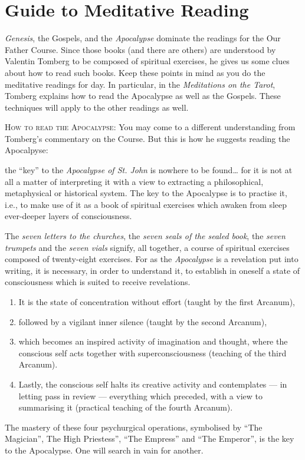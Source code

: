 \chapter{Guide to Meditative Reading}

\emph{Genesis}, the Gospels, and the \emph{Apocalypse} dominate the readings for the Our Father Course. Since those
books (and there are others) are understood by Valentin Tomberg to be composed of spiritual exercises, he gives us some
clues about how to read such books. Keep these points in mind as you do the meditative readings for day. In particular,
in the \emph{Meditations on the Tarot}, Tomberg explains how to read the Apocalypse as well as the Gospels. These
techniques will apply to the other readings as well.

\textsc{How to read the Apocalypse:}
You may come to a different understanding from Tomberg's commentary on the Course. But this is how
he suggests reading the Apocalpyse:

\begin{quotationx}
the “key” to the \emph{Apocalypse of St. John} is nowhere to be found… for it is not at all a matter of interpreting it
with a view to extracting a philosophical, metaphysical or historical system. The key to the Apocalypse is to practise
it, i.e., to make use of it as a book of spiritual exercises which awaken from sleep ever-deeper layers of
consciousness.

The \emph{seven letters to the churches}, the \emph{seven seals of the sealed book}, the \emph{seven trumpets} and the
\emph{seven vials} signify, all together, a course of spiritual exercises composed of twenty-eight exercises. For as
the \emph{Apocalypse} is a revelation put into writing, it is necessary, in order to understand it, to establish in
oneself a state of consciousness which is suited to receive revelations.

\begin{enumerate}
\item
It is the state of concentration without effort (taught by the first Arcanum), 
\item
followed by a vigilant inner silence (taught by the second Arcanum), 
\item
which becomes an inspired activity of imagination and thought, where the conscious self acts together with
superconsciousness (teaching of the third Arcanum). 
\item
Lastly, the conscious self halts its creative activity and contemplates — in letting pass in review — everything which preceded, with a view to summarising it (practical teaching of the fourth
Arcanum). 
\end{enumerate}
The mastery of these four psychurgical operations, symbolised by “The Magician”, The High Priestess”, “The Empress” and
“The Emperor”, is the key to the Apocalypse. One will search in vain for another. 

\end{quotationx}

